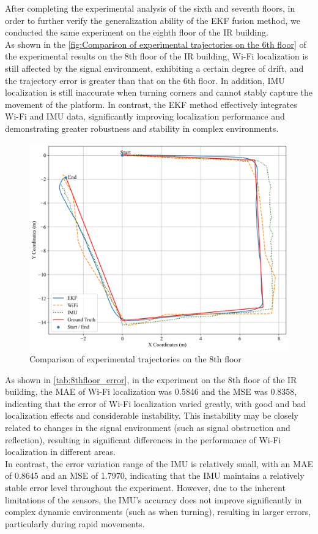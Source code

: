 \documentclass[12pt,a4paper]{article}
\numberwithin{equation}{section}
\begin{document}
\noindent After completing the experimental analysis of the sixth and seventh floors, in order to further verify the generalization ability of the EKF fusion method, we conducted the same experiment on the eighth floor of the IR building.\\
As shown in the \autoref{fig:Comparison of experimental trajectories on the 6th floor} of the experimental results on the 8th floor of the IR building, Wi-Fi localization is still affected by the signal environment, exhibiting a certain degree of drift, and the trajectory error is greater than that on the 6th floor. In addition, IMU localization is still inaccurate when turning corners and cannot stably capture the movement of the platform. In contrast, the EKF method effectively integrates Wi-Fi and IMU data, significantly improving localization performance and demonstrating greater robustness and stability in complex environments.
\begin{figure}[H]
    \centering
    \includegraphics[width=0.7\linewidth]{images/1/1.png}
    \caption{Comparison of experimental trajectories on the 8th floor}
    \label{fig:Comparison of experimental trajectories on the 6th floor}
\end{figure}
\noindent As shown in \autoref{tab:8thfloor_error}, in the experiment on the 8th floor of the IR building, the MAE of Wi-Fi localization was 0.5846 and the MSE was 0.8358, indicating that the error of Wi-Fi localization varied greatly, with good and bad localization effects and considerable instability. This instability may be closely related to changes in the signal environment (such as signal obstruction and reflection), resulting in significant differences in the performance of Wi-Fi localization in different areas.\\
In contrast, the error variation range of the IMU is relatively small, with an MAE of 0.8645 and an MSE of 1.7970, indicating that the IMU maintains a relatively stable error level throughout the experiment. However, due to the inherent limitations of the sensors, the IMU's accuracy does not improve significantly in complex dynamic environments (such as when turning), resulting in larger errors, particularly during rapid movements.
\end{document}
